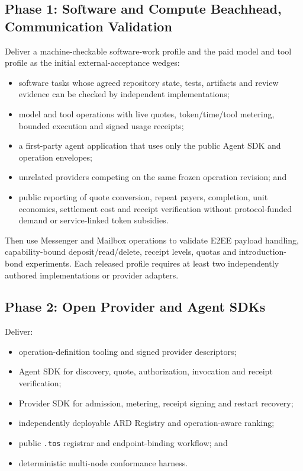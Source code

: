 \documentclass[11pt,oneside]{article}
\begin{document}
\subsection{Phase 1: Software and Compute Beachhead, Communication Validation}

Deliver a machine-checkable software-work profile and the paid model and tool profile as the
initial external-acceptance wedges:

\begin{itemize}
  \item software tasks whose agreed repository state, tests, artifacts and review evidence
        can be checked by independent implementations;
  \item model and tool operations with live quotes, token/time/tool metering, bounded
        execution and signed usage receipts;
  \item a first-party agent application that uses only the public Agent SDK and operation
        envelopes;
  \item unrelated providers competing on the same frozen operation revision; and
  \item public reporting of quote conversion, repeat payers, completion, unit economics,
        settlement cost and receipt verification without protocol-funded demand or
        service-linked token subsidies.
\end{itemize}

Then use Messenger and Mailbox operations to validate E2EE payload handling,
capability-bound deposit/read/delete, receipt levels, quotas and introduction-bond
experiments. Each released profile requires at least two independently authored
implementations or provider adapters.

\subsection{Phase 2: Open Provider and Agent SDKs}

Deliver:

\begin{itemize}
  \item operation-definition tooling and signed provider descriptors;
  \item Agent SDK for discovery, quote, authorization, invocation and receipt verification;
  \item Provider SDK for admission, metering, receipt signing and restart recovery;
  \item independently deployable ARD Registry and operation-aware ranking;
  \item public \texttt{.tos} registrar and endpoint-binding workflow; and
  \item deterministic multi-node conformance harness.
\end{itemize}
\end{document}
